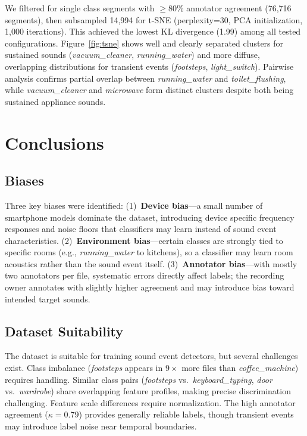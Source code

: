 \documentclass{article}
\begin{document}
We filtered for single class segments with $\geq$80\% annotator agreement (76,716 segments), then subsampled 14,994 for t-SNE (perplexity=30, PCA initialization, 1,000 iterations). This achieved the lowest KL divergence (1.99) among all tested configurations. Figure~\ref{fig:tsne} shows well and clearly separated clusters for sustained sounds (\textit{vacuum\_cleaner}, \textit{running\_water}) and more diffuse, overlapping distributions for transient events (\textit{footsteps}, \textit{light\_switch}). Pairwise analysis confirms partial overlap between \textit{running\_water} and \textit{toilet\_flushing}, while \textit{vacuum\_cleaner} and \textit{microwave} form distinct clusters despite both being sustained appliance sounds.

\section{Conclusions}

\subsection{Biases}
Three key biases were identified: (1)~\textbf{Device bias}---a small number of smartphone models dominate the dataset, introducing device specific frequency responses and noise floors that classifiers may learn instead of sound event characteristics. (2)~\textbf{Environment bias}---certain classes are strongly tied to specific rooms (e.g., \textit{running\_water} to kitchens), so a classifier may learn room acoustics rather than the sound event itself. (3)~\textbf{Annotator bias}---with mostly two annotators per file, systematic errors directly affect labels; the recording owner annotates with slightly higher agreement and may introduce bias toward intended target sounds.

\subsection{Dataset Suitability}
The dataset is suitable for training sound event detectors, but several challenges exist. Class imbalance (\textit{footsteps} appears in $9\times$ more files than \textit{coffee\_machine}) requires handling. Similar class pairs (\textit{footsteps} vs.\ \textit{keyboard\_typing}, \textit{door} vs.\ \textit{wardrobe}) share overlapping feature profiles, making precise discrimination challenging. Feature scale differences require normalization. The high annotator agreement ($\kappa = 0.79$) provides generally reliable labels, though transient events may introduce label noise near temporal boundaries.
\end{document}
